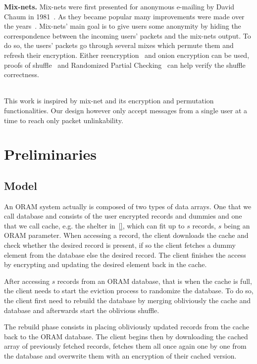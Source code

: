 \documentclass[USenglish,oneside,twocolumn]{article}
\begin{document}
\noindent\textbf{Mix-nets.}
Mix-nets were first presented for anonymous e-mailing by David Chaum in 1981~\cite{chaum1981untraceable}. As they became popular many improvements were made over the years~\cite{moller2003mixmaster,danezis2003mixminion,danezis2004minx,danezis2009sphinx}. Mix-nets' main goal is to give users some anonymity by hiding the correspondence between the incoming users' packets and the mix-nets output. To do so, the users' packets go through several mixes which permute them and refresh their encryption. Either reencryption~\cite{wikstrom2006adaptively} and onion encryption can be used, proofs of shuffle~\cite{groth2007verifiable,groth2007non,bayer2012efficient} and Randomized Partial Checking~\cite{jakobsson2002making} can help verify the shuffle correctness.\\\

This work is inspired by mix-net and its encryption and permutation functionalities. Our design however only accept messages from a single user at a time to reach only packet unlinkability.
%
\section{Preliminaries}\label{Prelim}
%
\subsection{Model}\label{Model}

An ORAM system actually is composed of two types of data arrays. One that we call database and consists of the user encrypted records and dummies and one that we call cache, e.g. the shelter in~\ref{}, which can fit up to $s$ records, $s$ being an ORAM parameter.
When accessing a record, the client downloads the cache and check whether the desired record is present, if so the client fetches a dummy element from the database else the desired record. The client finishes the access by encrypting and updating the desired element back in the cache.

After accessing $s$ records from an ORAM database, that is when the cache is full, the client needs to start the eviction process to randomize the database. To do so, the client first need to rebuild the database by merging obliviously the cache and database and afterwards start the oblivious shuffle.

The rebuild phase consists in placing obliviously updated records from the cache back to the ORAM database. The client begins then by downloading the cached array of previously fetched records, fetches them all once again one by one from the database and overwrite them with an encryption of their cached version.
\end{document}

